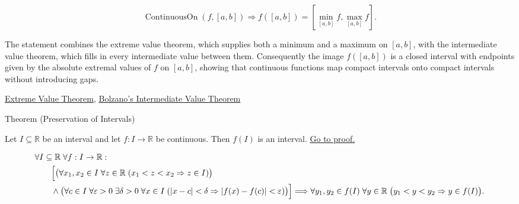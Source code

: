 \begin{remark*}
\[
\operatorname{ContinuousOn}(f,[a,b]) \Longrightarrow f([a,b])=[\min_{[a,b]} f,\max_{[a,b]} f].
\]
\end{remark*}

\begin{remark*}[Interpretation]
The statement combines the extreme value theorem, which supplies both a minimum and a maximum on $[a,b]$, with the intermediate value theorem, which fills in every intermediate value between them. Consequently the image $f([a,b])$ is a closed interval with endpoints given by the absolute extremal values of $f$ on $[a,b]$, showing that continuous functions map compact intervals onto compact intervals without introducing gaps.
\end{remark*}

\begin{dependencies}
\hyperref[thm:extreme-value-theorem]{Extreme Value Theorem},
\hyperref[thm:bolzano-intermediate-value]{Bolzano's Intermediate Value Theorem}
\end{dependencies}


\begin{theorembox}{Theorem (Preservation of Intervals)}
\begin{theorem}
\label{thm:preservation-of-intervals}
Let $I \subseteq \mathbb{R}$ be an interval and let $f:I \to \mathbb{R}$ be continuous. Then $f(I)$ is an interval.
\hyperref[prf:preservation-of-intervals]{Go to proof.}
\end{theorem}
\end{theorembox}

\begin{remark*}
\[
\begin{aligned}
&\forall I\subseteq\mathbb{R}\;\forall f:I\to\mathbb{R}:\\
&\qquad
\Bigl[
\bigl(\forall x_1,x_2\in I\;\forall z\in\mathbb{R}\;(x_1<z<x_2\Rightarrow z\in I)\bigr)\\
&\qquad\land
\bigl(\forall c\in I\;\forall \varepsilon>0\;\exists \delta>0\;\forall x\in I\;
(|x-c|<\delta\Rightarrow |f(x)-f(c)|<\varepsilon)\bigr)
\Bigr]
\Longrightarrow
\forall y_1,y_2 \in f(I)\; \forall y \in \mathbb{R}\;
\bigl(y_1 < y < y_2 \Rightarrow y \in f(I)\bigr).
\end{aligned}
\]
\end{remark*}

